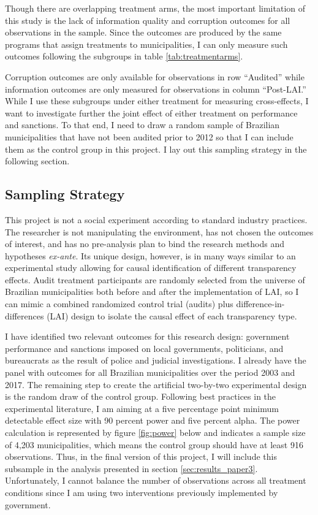 \documentclass[11pt]{article}
\begin{document}
Though there are overlapping treatment arms, the most important limitation of this study is the lack of information quality and corruption outcomes for all observations in the sample. Since the outcomes are produced by the same programs that assign treatments to municipalities, I can only measure such outcomes following the subgroups in table \ref{tab:treatmentarms}.



Corruption outcomes are only available for observations in row ``Audited'' while information outcomes are only measured for observations in column ``Post-LAI.'' While I use these subgroups under either treatment for measuring cross-effects, I want to investigate further the joint effect of either treatment on performance and sanctions. To that end, I need to draw a random sample of Brazilian municipalities that have not been audited prior to 2012 so that I can include them as the control group in this project. I lay out this sampling strategy in the following section.

\subsection{Sampling Strategy} \label{sec:sampling_paper3}

This project is not a social experiment according to standard industry practices. The researcher is not manipulating the environment, has not chosen the outcomes of interest, and has no pre-analysis plan to bind the research methods and hypotheses \emph{ex-ante}. Its unique design, however, is in many ways similar to an experimental study allowing for causal identification of different transparency effects. Audit treatment participants are randomly selected from the universe of Brazilian municipalities both before and after the implementation of LAI, so I can mimic a combined randomized control trial (audits) plus difference-in-differences (LAI) design to isolate the causal effect of each transparency type.

I have identified two relevant outcomes for this research design: government performance and sanctions imposed on local governments, politicians, and bureaucrats as the result of police and judicial investigations. I already have the panel with outcomes for all Brazilian municipalities over the period 2003 and 2017. The remaining step to create the artificial two-by-two experimental design is the random draw of the control group. Following best practices in the experimental literature, I am aiming at a five percentage point minimum detectable effect size with 90 percent power and five percent alpha. The power calculation is represented by figure \ref{fig:power} below and indicates a sample size of 4,203 municipalities, which means the control group should have at least 916 observations. Thus, in the final version of this project, I will include this subsample in the analysis presented in section \ref{sec:results_paper3}. Unfortunately, I cannot balance the number of observations across all treatment conditions since I am using two interventions previously implemented by government.
\end{document}
